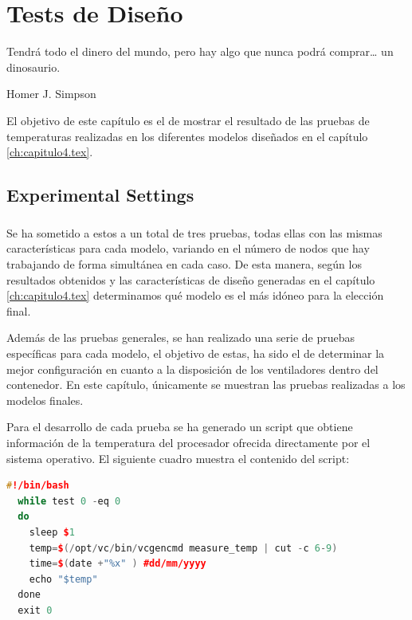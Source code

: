 \newpage
\chapter{Tests de Diseño}
\label{ch:capitulo5.tex}

\begin{FraseCelebre}
	\begin{Frase}
		Tendrá todo el dinero del mundo, pero hay algo que nunca podrá comprar… un dinosaurio.
	\end{Frase}
	\begin{Fuente}
	Homer J. Simpson
	\end{Fuente}
\end{FraseCelebre}

El objetivo de este capítulo es el de mostrar el resultado de las pruebas de temperaturas realizadas en los diferentes modelos diseñados en el capítulo \ref{ch:capitulo4.tex}. 

\section{Experimental Settings}
\label{makereference5.2}
\paragraph{}

Se ha sometido a estos a un total de tres pruebas, todas ellas con las mismas características para cada modelo, variando en el número de nodos que hay trabajando de forma simultánea en cada caso. De esta manera, según los resultados obtenidos y las características de diseño generadas en el capítulo \ref{ch:capitulo4.tex} determinamos qué modelo es el más idóneo para la elección final.

Además de las pruebas generales, se han realizado una serie de pruebas específicas para cada modelo, el objetivo de estas, ha sido el de determinar la mejor configuración en cuanto a la disposición de los ventiladores dentro del contenedor. En este capítulo, únicamente se muestran las pruebas realizadas a los modelos finales.

Para el desarrollo de cada prueba se ha generado un script que obtiene información de la temperatura del procesador ofrecida directamente por el sistema operativo. El siguiente cuadro muestra el contenido del script:

\begin{lstlisting}[language=c++,frame=single,numbers=none]
	#!/bin/bash
  while test 0 -eq 0 
  do
    sleep $1
    temp=$(/opt/vc/bin/vcgencmd measure_temp | cut -c 6-9)
    time=$(date +"%x" ) #dd/mm/yyyy
    echo "$temp"  
  done
  exit 0
\end{lstlisting}

